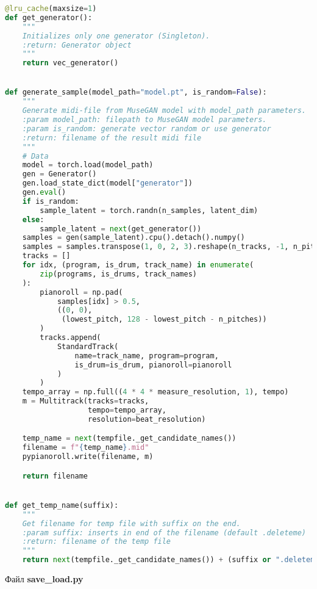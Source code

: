 \begin{lstlisting}[language=Python]
@lru_cache(maxsize=1)
def get_generator():
    """
    Initializes only one generator (Singleton).
    :return: Generator object
    """
    return vec_generator()


def generate_sample(model_path="model.pt", is_random=False):
    """
    Generate midi-file from MuseGAN model with model_path parameters.
    :param model_path: filepath to MuseGAN model parameters.
    :param is_random: generate vector random or use generator
    :return: filename of the result midi file
    """
    # Data
    model = torch.load(model_path)
    gen = Generator()
    gen.load_state_dict(model["generator"])
    gen.eval()
    if is_random:
        sample_latent = torch.randn(n_samples, latent_dim)
    else:
        sample_latent = next(get_generator())
    samples = gen(sample_latent).cpu().detach().numpy()
    samples = samples.transpose(1, 0, 2, 3).reshape(n_tracks, -1, n_pitches)
    tracks = []
    for idx, (program, is_drum, track_name) in enumerate(
        zip(programs, is_drums, track_names)
    ):
        pianoroll = np.pad(
            samples[idx] > 0.5,
            ((0, 0),
             (lowest_pitch, 128 - lowest_pitch - n_pitches))
        )
        tracks.append(
            StandardTrack(
                name=track_name, program=program,
                is_drum=is_drum, pianoroll=pianoroll
            )
        )
    tempo_array = np.full((4 * 4 * measure_resolution, 1), tempo)
    m = Multitrack(tracks=tracks,
                   tempo=tempo_array,
                   resolution=beat_resolution)

    temp_name = next(tempfile._get_candidate_names())
    filename = f"{temp_name}.mid"
    pypianoroll.write(filename, m)

    return filename


def get_temp_name(suffix):
    """
    Get filename for temp file with suffix on the end.
    :param suffix: inserts in end of the filename (default .deleteme)
    :return: filename of the temp file
    """
    return next(tempfile._get_candidate_names()) + (suffix or ".deleteme")

\end{lstlisting}

Файл \textbf{save\_load.py}

